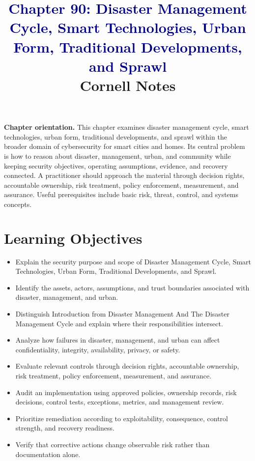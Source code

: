 \documentclass[11pt]{article}
\title{\textcolor{Navy}{Chapter 90: Disaster Management Cycle, Smart Technologies, Urban Form, Traditional Developments, and Sprawl}\\[2mm]\large Cornell Notes}
\author{}
\date{}
\begin{document}
\maketitle
\thispagestyle{fancy}
\vspace{-1.5em}
\begin{orientationbox}
\textbf{Chapter orientation.} This chapter examines disaster management cycle, smart technologies, urban form, traditional developments, and sprawl within the broader domain of cybersecurity for smart cities and homes. Its central problem is how to reason about disaster, management, urban, and community while keeping security objectives, operating assumptions, evidence, and recovery connected. A practitioner should approach the material through decision rights, accountable ownership, risk treatment, policy enforcement, measurement, and assurance. Useful prerequisites include basic risk, threat, control, and systems concepts.
\end{orientationbox}
\section*{Learning Objectives}
\begin{itemize}
\item Explain the security purpose and scope of Disaster Management Cycle, Smart Technologies, Urban Form, Traditional Developments, and Sprawl.
\item Identify the assets, actors, assumptions, and trust boundaries associated with disaster, management, and urban.
\item Distinguish Introduction from Disaster Management And The Disaster Management Cycle and explain where their responsibilities intersect.
\item Analyze how failures in disaster, management, and urban can affect confidentiality, integrity, availability, privacy, or safety.
\item Evaluate relevant controls through decision rights, accountable ownership, risk treatment, policy enforcement, measurement, and assurance.
\item Audit an implementation using approved policies, ownership records, risk decisions, control tests, exceptions, metrics, and management review.
\item Prioritize remediation according to exploitability, consequence, control strength, and recovery readiness.
\item Verify that corrective actions change observable risk rather than documentation alone.
\end{itemize}
\end{document}
